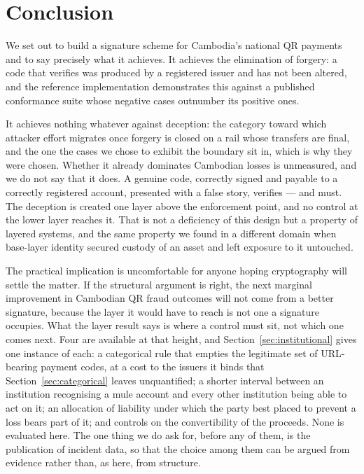 \documentclass[10pt,a4paper,twocolumn]{article}
\begin{document}
\section{Conclusion}

We set out to build a signature scheme for Cambodia's national QR payments and
to say precisely what it achieves. It achieves the elimination of forgery: a
code that verifies was produced by a registered issuer and has not been altered,
and the reference implementation demonstrates this against a published
conformance suite whose negative cases outnumber its positive ones.

It achieves nothing whatever against deception: the category toward which
attacker effort migrates once forgery is closed on a rail whose transfers are
final, and the one the cases we chose to exhibit the boundary sit in, which is
why they were chosen. Whether it already dominates Cambodian losses is
unmeasured, and we do not say that it does. A genuine code, correctly signed and payable to a correctly registered account,
presented with a false story, verifies --- and must. The deception is created one
layer above the enforcement point, and no control at the lower layer reaches it.
That is not a deficiency of this design but a property of layered systems, and
the same property we found in a different domain when base-layer identity
secured custody of an asset and left exposure to it untouched.

The practical implication is uncomfortable for anyone hoping cryptography will
settle the matter. If the structural argument is right, the next marginal
improvement in Cambodian QR fraud outcomes will not come from a better
signature, because the layer it would have to reach is not one a signature
occupies. What the layer result says is where a control must sit, not which
one comes next. Four are available at that height, and
Section~\ref{sec:institutional} gives one instance of each: a categorical rule
that empties the legitimate set of URL-bearing payment codes, at a cost to the
issuers it binds that Section~\ref{sec:categorical} leaves unquantified; a
shorter interval between an institution recognising a mule account and every
other institution being able to act on it; an allocation of liability under
which the party best placed to prevent a loss bears part of it; and controls on
the convertibility of the proceeds. None is evaluated here. The one thing we do
ask for, before any of them, is the publication of incident data, so that the
choice among them can be argued from evidence rather than, as here, from
structure.
\end{document}
